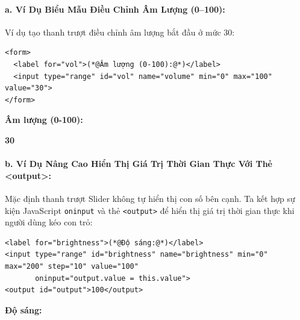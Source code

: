 \documentclass[11pt,oneside]{book}
\newcommand{\codeinline}[1]{\textcolor{accentOrange}{\texttt{#1}}}
\begin{document}
\paragraph{a. Ví Dụ Biểu Mẫu Điều Chỉnh Âm Lượng (0--100):}
Ví dụ tạo thanh trượt điều chỉnh âm lượng bắt đầu ở mức 30:

\begin{codeWindow}
\begin{lstlisting}[language=HTML5]
<form>
  <label for="vol">(*@Âm lượng (0-100):@*)</label>
  <input type="range" id="vol" name="volume" min="0" max="100" value="30">
</form>
\end{lstlisting}
\end{codeWindow}

\begin{browserWindow}
\sffamily\small
\textbf{Âm lượng (0-100):} \quad
{} \quad \textbf{30}
\end{browserWindow}

\paragraph{b. Ví Dụ Nâng Cao Hiển Thị Giá Trị Thời Gian Thực Với Thẻ <output>:}
Mặc định thanh trượt Slider không tự hiển thị con số bên cạnh. Ta kết hợp sự kiện JavaScript \codeinline{oninput} và thẻ \codeinline{<output>} để hiển thị giá trị thời gian thực khi người dùng kéo con trỏ:

\begin{codeWindow}
\begin{lstlisting}[language=HTML5]
<label for="brightness">(*@Độ sáng:@*)</label>
<input type="range" id="brightness" name="brightness" min="0" max="200" step="10" value="100" 
       oninput="output.value = this.value">
<output id="output">100</output>
\end{lstlisting}
\end{codeWindow}

\begin{browserWindow}
\sffamily\small
\textbf{Độ sáng:} \quad
{} \quad
{}
\end{browserWindow}
\end{document}
